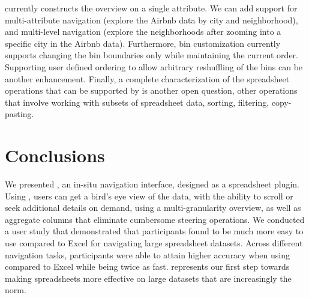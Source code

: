  \noah currently constructs the overview on a single attribute. We can add support for multi-attribute navigation (\eg explore the Airbnb data by city and neighborhood), and multi-level navigation (\eg explore the neighborhoods after zooming into a specific city in the Airbnb data).  Furthermore, bin customization currently supports changing the bin boundaries only while maintaining the current order. Supporting user defined ordering to allow arbitrary reshuffling of the bins can be another enhancement. Finally, a complete characterization of the spreadsheet operations that can be supported by \noah is another open question, \eg other operations that involve working with subsets of spreadsheet data, \eg sorting, filtering, copy-pasting.

\section{Conclusions}
\label{sec:conclusion}
We presented \noah, an in-situ navigation interface, designed as a spreadsheet plugin.
Using \noah, users can get a bird’s eye view of the data, with the ability to scroll or seek
additional details on demand, using a multi-granularity overview, as well as
aggregate columns that eliminate cumbersome steering operations.
We conducted a user study that demonstrated that participants found \noah to be much more easy to use compared to Excel for navigating large spreadsheet datasets. Across different navigation tasks, participants were able to attain 
higher accuracy when using \noah compared to
Excel while being twice as fast. 
\noah represents our 
first step towards making spreadsheets more effective 
on large datasets that are increasingly the norm.